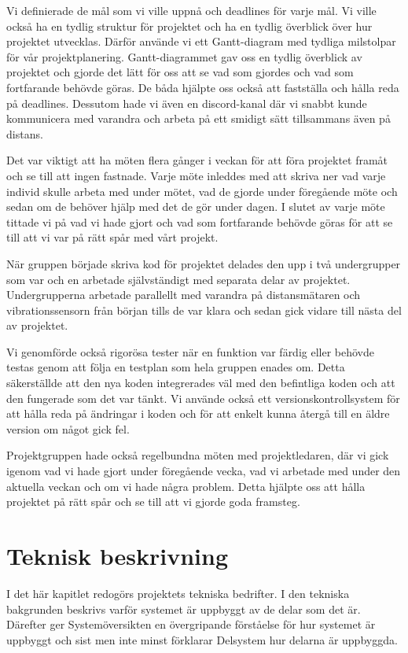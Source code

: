 \documentclass{article}
\begin{document}
Vi definierade de mål som vi ville uppnå och deadlines för varje mål. Vi ville också ha en tydlig struktur för projektet och ha en tydlig överblick över hur projektet utvecklas. Därför använde vi ett Gantt-diagram med tydliga milstolpar för vår projektplanering. Gantt-diagrammet gav oss en tydlig överblick av projektet och gjorde det lätt för oss att se vad som gjordes och vad som fortfarande behövde göras. De båda hjälpte oss också att fastställa och hålla reda på deadlines. Dessutom hade vi även en discord-kanal där vi snabbt kunde kommunicera med varandra och arbeta på ett smidigt sätt tillsammans även på distans.

Det var viktigt att ha möten flera gånger i veckan för att föra projektet framåt och se till att ingen fastnade. Varje möte inleddes med att skriva ner vad varje individ skulle arbeta med under mötet, vad de gjorde under föregående möte och sedan om de behöver hjälp med det de gör under dagen.  I slutet av varje möte tittade vi på vad vi hade gjort och vad som fortfarande behövde göras för att se till att vi var på rätt spår med vårt projekt.

När gruppen började skriva kod för projektet delades den upp i två undergrupper som var och en arbetade självständigt med separata delar av projektet. Undergrupperna arbetade parallellt med varandra på distansmätaren och vibrationssensorn från början tills de var klara och sedan gick vidare till nästa del av projektet.

Vi genomförde också rigorösa tester när en funktion var färdig eller behövde testas genom att följa en testplan som hela gruppen enades om. Detta säkerställde att den nya koden integrerades väl med den befintliga koden och att den fungerade som det var tänkt. Vi använde också ett versionskontrollsystem för att hålla reda på ändringar i koden och för att enkelt kunna återgå till en äldre version om något gick fel.

Projektgruppen hade också regelbundna möten med projektledaren, där vi gick igenom vad vi hade gjort under föregående vecka, vad vi arbetade med under den aktuella veckan och om vi hade några problem. Detta hjälpte oss att hålla projektet på rätt spår och se till att vi gjorde goda framsteg.

\section{Teknisk beskrivning}
I det här kapitlet redogörs projektets tekniska bedrifter. 
I den tekniska bakgrunden beskrivs varför systemet är uppbyggt av de delar som det är.
Därefter ger Systemöversikten en övergripande förståelse för hur systemet är uppbyggt och sist men inte minst förklarar Delsystem hur delarna är uppbyggda.
\end{document}
